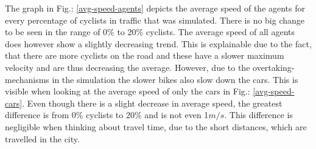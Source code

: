 The graph in Fig.: \ref{avg-speed-agents} depicts the average speed of the agents for every percentage of cyclists in traffic that was simulated. There is no big change to be seen in the range of 0\% to 20\% cyclists. The average speed of all agents does however show a slightly decreasing trend. This is explainable due to the fact, that there are more cyclists on the road and these have a slower maximum velocity and are thus decreasing the average. However, due to the overtaking-mechanisms in the simulation the slower bikes also slow down the cars. This is visible when looking at the average speed of only the cars in Fig.: \ref{avg-speed-cars}. Even though there is a slight decrease in average speed, the greatest difference is from 0\% cyclists to 20\% and is not even 1$m/s$. This difference is negligible when thinking about travel time, due to the short distances, which are travelled in the city.
\vspace{-0.2cm}
